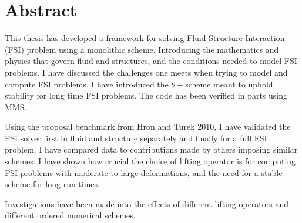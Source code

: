 \section*{Abstract}
This thesis has developed a framework for solving Fluid-Structure Interaction (FSI) problem using a monolithic scheme. Introducing the mathematics and physics that govern fluid and structures, and the conditions needed to model FSI problems. I have discussed the challenges one meets when trying to model and compute FSI problems. I have introduced the $\theta-$scheme meant to uphold stability for long time FSI problems. The code has been verified in parts using MMS. \newline

Using the proposal benchmark from Hron and Turek 2010, I have validated the FSI solver first in fluid and structure separately and finally for a full FSI problem. I have compared data to contributions made by others imposing similar schemes. I have shown how crucial the choice of lifting operator is for computing FSI problems with moderate to large deformations, and the need for a stable scheme for long run times.

Investigations have been made into the effects of different lifting operators and different ordered numerical schemes.

